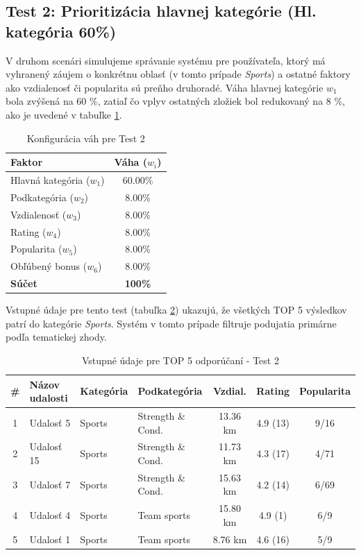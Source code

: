 \documentclass[12pt,a4paper]{article}
\begin{document}
\subsection{Test 2: Prioritizácia hlavnej kategórie (Hl. kategória 60\%)}

V druhom scenári simulujeme správanie systému pre používateľa, ktorý má vyhranený záujem o konkrétnu oblasť (v tomto prípade \textit{Sports}) a ostatné faktory ako vzdialenosť či popularita sú preňho druhoradé. Váha hlavnej kategórie $w_1$ bola zvýšená na 60 \%, zatiaľ čo vplyv ostatných zložiek bol redukovaný na 8 \%, ako je uvedené v tabuľke \ref{tab:vahy_test2}.

\begin{table}[H]
\centering
\begin{tabular}{|l|c|}
\hline
\textbf{Faktor} & \textbf{Váha ($w_i$)} \\
\hline
Hlavná kategória ($w_1$) & 60.00\% \\
Podkategória ($w_2$) & 8.00\% \\
Vzdialenosť ($w_3$) & 8.00\% \\
Rating ($w_4$) & 8.00\% \\
Popularita ($w_5$) & 8.00\% \\
Obľúbený bonus ($w_6$) & 8.00\% \\
\hline
\textbf{Súčet} & \textbf{100\%} \\
\hline
\end{tabular}
\caption{Konfigurácia váh pre Test 2}
\label{tab:vahy_test2}
\end{table}

Vstupné údaje pre tento test (tabuľka \ref{tab:data_test2}) ukazujú, že všetkých TOP 5 výsledkov patrí do kategórie \textit{Sports}. Systém v tomto prípade filtruje podujatia primárne podľa tematickej zhody.

\begin{table}[H]
\centering
\small
\begin{tabular}{|c|l|l|l|c|c|c|}
\hline
\textbf{\#} & \textbf{Názov udalosti} & \textbf{Kategória} & \textbf{Podkategória} & \textbf{Vzdial.} & \textbf{Rating} & \textbf{Popularita} \\
\hline
1 & Udalosť 5  & Sports & Strength \& Cond. & 13.36 km & 4.9 (13) & 9/16 \\
2 & Udalosť 15 & Sports & Strength \& Cond. & 11.73 km & 4.3 (17) & 4/71 \\
3 & Udalosť 7  & Sports & Strength \& Cond. & 15.63 km & 4.2 (14) & 6/69 \\
4 & Udalosť 4  & Sports & Team sports       & 15.80 km & 4.9 (1)  & 6/9 \\
5 & Udalosť 1  & Sports & Team sports       & 8.76 km  & 4.6 (16) & 5/9 \\
\hline
\end{tabular}
\caption{Vstupné údaje pre TOP 5 odporúčaní - Test 2}
\label{tab:data_test2}
\end{table}
\end{document}
